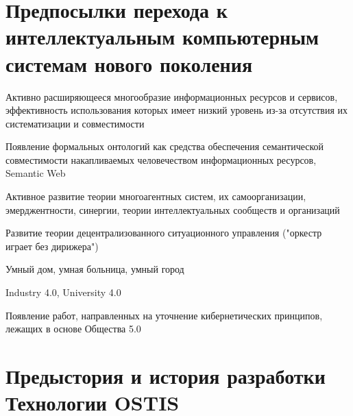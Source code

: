 \section*{Предпосылки перехода к интеллектуальным компьютерным системам нового поколения}
\label{concl_transition_background}

\begin{textitemize}
\item Активно расширяющееся многообразие информационных ресурсов и сервисов, эффективность использования которых имеет низкий уровень из-за отсутствия их систематизации и совместимости 
\item Появление формальных онтологий как средства обеспечения семантической совместимости накапливаемых человечеством информационных ресурсов, Semantic Web
\item Активное развитие теории многоагентных систем, их самоорганизации, эмерджентности, синергии, теории интеллектуальных сообществ и организаций
\item Развитие теории децентрализованного ситуационного управления ("оркестр играет без дирижера"{})
\item Умный дом, умная больница, умный город
\item Industry 4.0, University 4.0
\item Появление работ, направленных на уточнение кибернетических принципов, лежащих в основе Общества 5.0
\end{textitemize}

\section*{Предыстория и история разработки Технологии OSTIS}
\label{concl_ostis_history}

